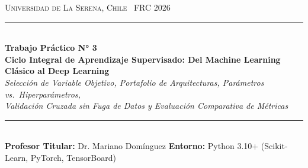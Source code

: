 \documentclass[11pt,a4paper]{article}
\begin{document}
\begin{center}
    {\large\scshape Universidad de La Serena, Chile  \textbar\ FRC 2026}\\[0.2cm]
    {\color{NavyMain}\rule{\textwidth}{2pt}}\\[0.35cm]
    {\huge\bfseries\color{NavyMain} Trabajo Práctico N° 3}\\[0.25cm]
    {\Large\bfseries\color{BlueAccent} Ciclo Integral de Aprendizaje Supervisado: Del Machine Learning Clásico al Deep Learning}\\[0.15cm]
    {\large\itshape Selección de Variable Objetivo, Portafolio de Arquitecturas, Parámetros vs.\ Hiperparámetros,\\
    Validación Cruzada sin Fuga de Datos y Evaluación Comparativa de Métricas}\\[0.35cm]
    {\color{NavyMain}\rule{\textwidth}{1pt}}\\[0.3cm]
    \textbf{Profesor Titular:} Dr. Mariano Domínguez \quad\textbar\quad
    \textbf{Entorno:} Python 3.10+ (Scikit-Learn, PyTorch, TensorBoard)
\end{center}

\vspace{0.3cm}
\end{document}

